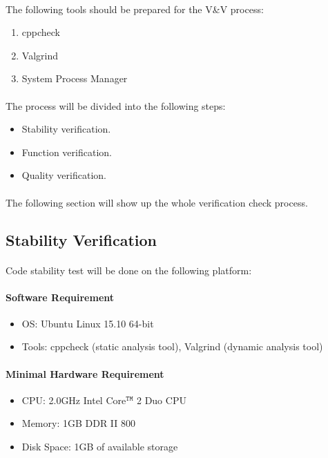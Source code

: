 \documentclass[11pt,a4paper]{article}
\begin{document}
            \paragraph{} The following tools should be prepared for the V\&V process:
            \begin{enumerate}
                \item cppcheck
                \item Valgrind
                \item System Process Manager
            \end{enumerate}
            \paragraph{} The process will be divided into the following steps:
            \begin{itemize}
                \item Stability verification.
                \item Function verification.
                \item Quality verification.
            \end{itemize}
            \paragraph{} The following section will show up the whole verification check process.
        \subsection{Stability Verification}
            \paragraph{} Code stability test will be done on the following platform:
            \paragraph{Software Requirement}
            \begin{itemize}
                \item OS: Ubuntu Linux 15.10 64-bit
                \item Tools: cppcheck (static analysis tool), Valgrind (dynamic analysis tool)
            \end{itemize}
            \paragraph{Minimal Hardware Requirement}
            \begin{itemize}
                \item CPU: 2.0GHz Intel{\textregistered} Core$^{\texttt{TM}}$ 2 Duo CPU
                \item Memory: 1GB DDR II 800
                \item Disk Space: 1GB of available storage
            \end{itemize}
\end{document}
